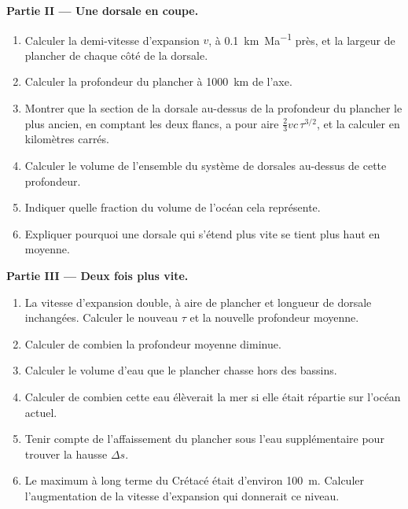\begin{problem}
\noindent\textbf{Partie II --- Une dorsale en coupe.}
\begin{enumerate}[resume]
\item Calculer la demi-vitesse d'expansion $v$, à \qty{0.1}{km.Ma^{-1}}
près, et la largeur de plancher de chaque côté de la dorsale.
  \item Calculer la profondeur du plancher à \qty{1000}{km} de l'axe.
\item Montrer que la section de la dorsale au-dessus de la profondeur
du plancher le plus ancien, en comptant les deux flancs, a pour
aire $\tfrac23 v c\,\tau^{3/2}$, et la calculer en kilomètres carrés.
  \item Calculer le volume de l'ensemble du système de dorsales au-dessus de cette profondeur.
  \item Indiquer quelle fraction du volume de l'océan cela représente.
  \item Expliquer pourquoi une dorsale qui s'étend plus vite se tient plus haut en moyenne.
\end{enumerate}

\noindent\textbf{Partie III --- Deux fois plus vite.}
\begin{enumerate}[resume]
\item La vitesse d'expansion double, à aire de plancher et longueur de dorsale
inchangées. Calculer le nouveau $\tau$ et la nouvelle profondeur moyenne.
  \item Calculer de combien la profondeur moyenne diminue.
  \item Calculer le volume d'eau que le plancher chasse hors des bassins.
  \item Calculer de combien cette eau élèverait la mer si elle était répartie sur l'océan actuel.
  \item Tenir compte de l'affaissement du plancher sous l'eau supplémentaire pour trouver la hausse $\Delta s$.
\item Le maximum à long terme du Crétacé était d'environ \qty{100}{m}.
Calculer l'augmentation de la vitesse d'expansion qui donnerait ce niveau.
\end{enumerate}


\end{problem}
